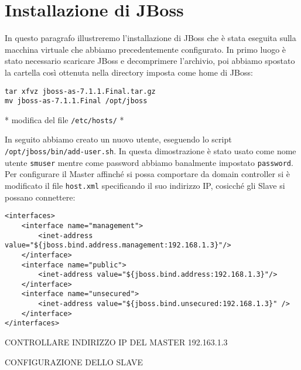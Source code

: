\documentclass[twoside]{article}
\begin{document}
\section{Installazione di JBoss}
In questo paragrafo illustreremo l'installazione di JBoss \cite{bib:jboss}
che è stata eseguita sulla macchina virtuale che abbiamo precedentemente configurato. 
In primo luogo è stato necessario scaricare JBoss e decomprimere
l'archivio, poi abbiamo spostato la cartella così ottenuta nella directory imposta come
home di JBoss:
\begin{lstlisting}[frame=trBL]
tar xfvz jboss-as-7.1.1.Final.tar.gz
mv jboss-as-7.1.1.Final /opt/jboss
\end{lstlisting}

* modifica del file \texttt{/etc/hosts/} *

In seguito abbiamo creato un nuovo utente, eseguendo lo script \texttt{/opt/jboss/bin/add-user.sh}.
In questa dimostrazione è stato usato come nome utente \texttt{smuser} mentre come password abbiamo
banalmente impostato \texttt{password}.
Per configurare il Master affinché si possa comportare da domain controller si è modificato il file
\texttt{host.xml} specificando il suo indirizzo IP, cosicché gli Slave si possano connettere:
\begin{lstlisting}[frame=trBL]
<interfaces>
	<interface name="management">
		<inet-address value="${jboss.bind.address.management:192.168.1.3}"/>
	</interface>
	<interface name="public">
		<inet-address value="${jboss.bind.address:192.168.1.3}"/>
	</interface>
	<interface name="unsecured">
		<inet-address value="${jboss.bind.unsecured:192.168.1.3}" />
	</interface>
</interfaces>
\end{lstlisting}
CONTROLLARE INDIRIZZO IP DEL MASTER 192.163.1.3

CONFIGURAZIONE DELLO SLAVE
\end{document}
